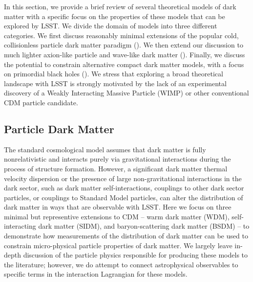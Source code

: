 
In this section, we provide a brief review of several theoretical models of dark matter with a specific focus on the properties of these models that can be explored by LSST. 
We divide the domain of models into three different categories. 
We first discuss reasonably minimal extensions of the popular cold, collisionless particle dark matter paradigm (). 
We then extend our discussion to much lighter axion-like particle and wave-like dark matter (). 
Finally, we discuss the potential to constrain alternative compact dark matter models, with a focus on primordial black holes ().
We stress that exploring a broad theoretical landscape with LSST is strongly motivated by the lack of an experimental discovery of a Weakly Interacting Massive Particle (WIMP) or other conventional CDM particle candidate. 

\subsection{Particle Dark Matter }
\label{sec:particles}


The standard \LCDM cosmological model assumes that dark matter is fully nonrelativistic and interacts purely via gravitational interactions during the process of structure formation. However, a significant dark matter thermal velocity dispersion or the presence of large non-gravitational interactions in the dark sector, such as dark matter self-interactions, couplings to other dark sector particles, or couplings to Standard Model particles, can alter the distribution of dark matter in ways that are observable with LSST. Here we focus on three minimal but representive extensions to CDM -- warm dark matter (WDM), self-interacting dark matter (SIDM), and baryon-scattering dark matter (BSDM) --  to demonstrate how measurements of the distribution of dark matter can be used to constrain micro-physical particle properties of dark matter. We largely leave in-depth discussion of the particle physics responsible for producing these models to the literature; however, we do attempt to connect astrophysical observables to specific terms in the interaction Lagrangian for these models.



